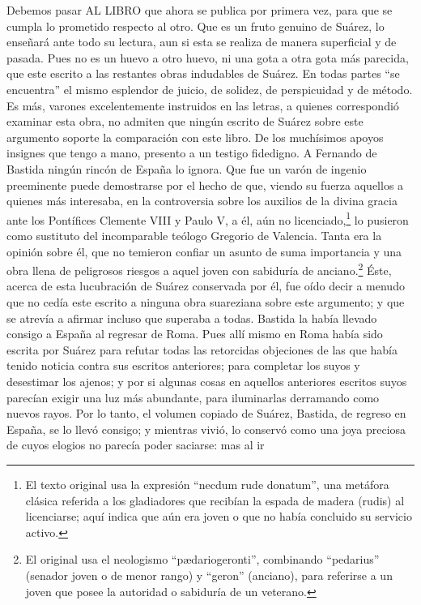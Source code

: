 \documentclass{article}
\begin{document}
Debemos pasar AL LIBRO que ahora se publica por primera vez, para que se cumpla lo
prometido respecto al otro. Que es un fruto genuino de Suárez, lo enseñará ante todo su
lectura, aun si esta se realiza de manera superficial y de pasada. Pues no es un huevo a
otro huevo, ni una gota a otra gota más parecida, que este escrito a las restantes obras
indudables de Suárez. En todas partes \enquote{se encuentra} el mismo esplendor de
juicio, de solidez, de perspicuidad y de método. Es más, varones excelentemente
instruidos en las letras, a quienes correspondió examinar esta obra, no admiten que
ningún escrito de Suárez sobre este argumento soporte la comparación con este libro. De
los muchísimos apoyos insignes que tengo a mano, presento a un testigo fidedigno. A
Fernando de Bastida ningún rincón de España lo ignora. Que fue un varón de ingenio
preeminente puede demostrarse por el hecho de que, viendo su fuerza aquellos a quienes
más interesaba, en la controversia sobre los auxilios de la divina gracia ante los
Pontífices Clemente VIII y Paulo V, a él, aún no licenciado,\footnote{El texto original
usa la expresión \enquote{necdum rude donatum}, una metáfora clásica referida a los
gladiadores que recibían la espada de madera (rudis) al licenciarse; aquí indica que aún
era joven o que no había concluido su servicio activo.} lo pusieron como sustituto del
incomparable teólogo Gregorio de Valencia. Tanta era la opinión sobre él, que no
temieron confiar un asunto de suma importancia y una obra llena de peligrosos riesgos a
aquel joven con sabiduría de anciano.\footnote{El original usa el neologismo
\enquote{pædariogeronti}, combinando \enquote{pedarius} (senador joven o de menor rango)
y \enquote{geron} (anciano), para referirse a un joven que posee la autoridad o
sabiduría de un veterano.} Éste, acerca de esta lucubración de Suárez conservada por él,
fue oído decir a menudo que no cedía este escrito a ninguna obra suareziana sobre este
argumento; y que se atrevía a afirmar incluso que superaba a todas. Bastida la había
llevado consigo a España al regresar de Roma. Pues allí mismo en Roma había sido escrita
por Suárez para refutar todas las retorcidas objeciones de las que había tenido noticia
contra sus escritos anteriores; para completar los suyos y desestimar los ajenos; y por
si algunas cosas en aquellos anteriores escritos suyos parecían exigir una luz más
abundante, para iluminarlas derramando como nuevos rayos. Por lo tanto, el volumen
copiado de Suárez, Bastida, de regreso en España, se lo llevó consigo; y mientras vivió,
lo conservó como una joya preciosa de cuyos elogios no parecía poder saciarse: mas al ir
\end{document}
